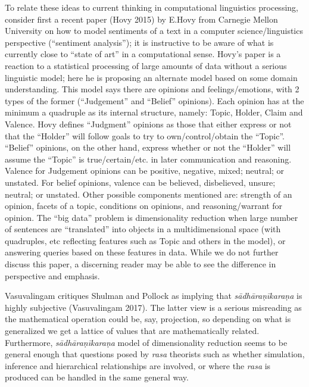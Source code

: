 To relate these ideas to current thinking in computational linguistics processing, consider first a recent paper (Hovy 2015) by E.Hovy from Carnegie Mellon University on how to model sentiments of a text in a computer science/linguistics perspective (“sentiment analysis”); it is instructive to be aware of what is currently close to “state of art” in a computational sense. Hovy’s paper is a reaction to a statistical processing of large amounts of data without a serious linguistic model; here he is proposing an alternate model based on some domain understanding. This model says there are opinions and feelings/emotions, with 2 types of the former (“Judgement” and “Belief” opinions). Each opinion has at the minimum a quadruple as its internal structure, namely: Topic, Holder, Claim and Valence. Hovy defines “Judgment” opinions as those that either express or not that the “Holder” will follow goals to try to own/control/obtain the “Topic”. “Belief” opinions, on the other hand, express whether or not the “Holder” will assume the “Topic” is true/certain/etc. in later communication and reasoning. Valence for Judgement opinions can be positive, negative, mixed; neutral; or unstated. For belief opinions, valence can be believed, disbelieved, unsure; neutral; or unstated. Other possible components mentioned are: strength of an opinion, facets of a topic, conditions on opinions, and reasoning/warrant for opinion. The “big data” problem is dimensionality reduction when large number of sentences are “translated” into objects in a multidimensional space (with quadruples, etc reflecting features such as Topic and others in the model), or answering queries based on these features in data. While we do not further discuss this paper, a discerning reader may be able to see the difference in perspective and emphasis.

Vasuvalingam critiques Shulman and Pollock as implying that \textsl{sādhāraṇīkaraṇa} is highly subjective (Vasuvalingam 2017). The latter view is a serious misreading as the mathematical operation could be, say, projection, so depending on what is generalized we get a lattice of values that are mathematically related. Furthermore, \textsl{sādhāraṇīkaraṇa} model of dimensionality reduction seems to be general enough that questions posed by \textsl{rasa} theorists such as whether simulation, inference and hierarchical relationships are involved, or where the \textsl{rasa} is produced can be handled in the same general way.

